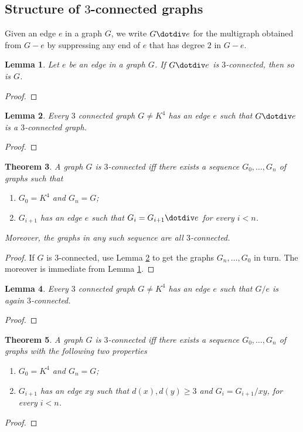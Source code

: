 \documentclass[12pt]{article}
\theoremstyle{plain}
\newtheorem{thm}{Theorem}
\newtheorem{lem}[thm]{Lemma}
\theoremstyle{definition}
\theoremstyle{remark}
\begin{document}
\subsection{Structure of $3$-connected graphs}
Given an edge $e$ in a graph $G$, we write $G \dotdiv e$ for the multigraph obtained from $G-e$ by suppressing any end of $e$ that has degree $2$ in $G-e$.  

\begin{lem}\label{DotDivPreserves}
Let $e$ be an edge in a graph $G$.  If $G \dotdiv e$ is $3$-connected, then so is $G$.
\end{lem}
\begin{proof}
\end{proof}

\begin{lem}\label{CanDotDiv}
Every $3$ connected graph $G \neq K^4$ has an edge $e$ such that $G \dotdiv e$ is a $3$-connected graph.
\end{lem}
\begin{proof}
\end{proof}

\begin{thm}
A graph $G$ is $3$-connected iff there exists a sequence $G_0, \ldots, G_n$ of graphs such that
\begin{enumerate}
\item $G_0 = K^4$ and $G_n = G$;
\item $G_{i+1}$ has an edge $e$ such that $G_i = G_{i+1} \dotdiv e$ for every $i < n$.
\end{enumerate}
Moreover, the graphs in any such sequence are all $3$-connected.
\end{thm}
\begin{proof}
If $G$ is $3$-connected, use Lemma \ref{CanDotDiv} to get the graphs $G_n, \ldots, G_0$ in turn.  The moreover is immediate from Lemma \ref{DotDivPreserves}.
\end{proof}

\begin{lem}
Every $3$ connected graph $G \neq K^4$ has an edge $e$ such that $G/e$ is again $3$-connected. 
\end{lem}
\begin{proof}
\end{proof}

\begin{thm}
A graph $G$ is $3$-connected iff there exists a sequence $G_0, \ldots, G_n$ of graphs with the following two properties
\begin{enumerate}
\item $G_0 = K^4$ and $G_n = G$;
\item $G_{i+1}$ has an edge $xy$ such that $d(x), d(y) \geq 3$ and $G_i = G_{i+1} / xy$, for every $i < n$.
\end{enumerate}
\end{thm}
\begin{proof}
\end{proof}
\end{document}
